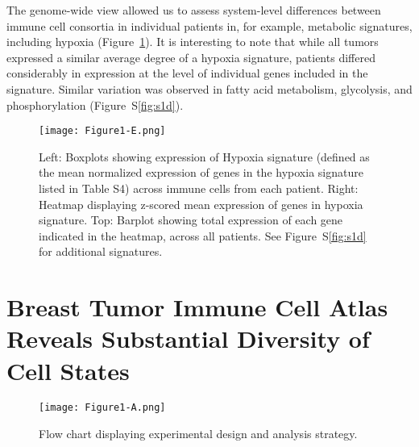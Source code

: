 The genome-wide view allowed us to assess system-level differences between immune cell consortia in individual patients in, for example, metabolic signatures, including hypoxia (Figure~\ref{fig:1e}).
It is interesting to note that while all tumors expressed a similar average degree of a hypoxia signature, patients differed considerably in expression at the level of individual genes included in the signature.
Similar variation was observed in fatty acid metabolism, glycolysis, and phosphorylation (Figure~S\ref{fig:s1d}).

\begin{figure}
\centering
\texttt{[image: Figure1-E.png]}
\caption{Left: Boxplots showing expression of Hypoxia signature (defined as the mean normalized expression of genes in the hypoxia signature listed in Table S4) across immune cells from each patient.
  Right: Heatmap displaying z-scored mean expression of genes in hypoxia signature.
  Top: Barplot showing total expression of each gene indicated in the heatmap, across all patients.
  See Figure~S\ref{fig:s1d} for additional signatures.
}
\label{fig:1e}
\end{figure}

\section{Breast Tumor Immune Cell Atlas Reveals Substantial Diversity of Cell States}

\begin{figure}
\centering
\texttt{[image: Figure1-A.png]}
\caption{Flow chart displaying experimental design and analysis strategy.}
\label{fig:1a}
\end{figure} %

